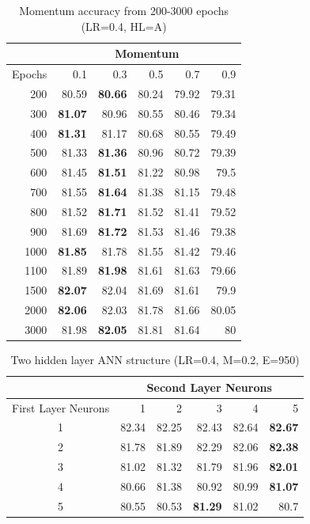 \documentclass[12pt]{article}
\begin{document}
      \begin{table}[H]
        \centering
        \caption{Momentum accuracy from 200-3000 epochs (LR=0.4, HL=A)}
          \begin{tabular}{r|rrrrr}
          \toprule
                & \multicolumn{5}{c}{Momentum} \\
          \midrule
          \multicolumn{1}{l|}{Epochs} & 0.1   & 0.3   & 0.5   & 0.7   & 0.9 \\
          \midrule
          200   & 80.59 & \textbf{80.66} & 80.24 & 79.92 & 79.31 \\
          300   & \textbf{81.07} & 80.96 & 80.55 & 80.46 & 79.34 \\
          400   & \textbf{81.31} & 81.17 & 80.68 & 80.55 & 79.49 \\
          500   & 81.33 & \textbf{81.36} & 80.96 & 80.72 & 79.39 \\
          600   & 81.45 & \textbf{81.51} & 81.22 & 80.98 & 79.5 \\
          700   & 81.55 & \textbf{81.64} & 81.38 & 81.15 & 79.48 \\
          800   & 81.52 & \textbf{81.71} & 81.52 & 81.41 & 79.52 \\
          900   & 81.69 & \textbf{81.72} & 81.53 & 81.46 & 79.38 \\
          1000  & \textbf{81.85} & 81.78 & 81.55 & 81.42 & 79.46 \\
          1100  & 81.89 & \textbf{81.98} & 81.61 & 81.63 & 79.66 \\
          1500  & \textbf{82.07} & 82.04 & 81.69 & 81.61 & 79.9 \\
          2000  & \textbf{82.06} & 82.03 & 81.78 & 81.66 & 80.05 \\
          3000  & 81.98 & \textbf{82.05} & 81.81 & 81.64 & 80 \\
          \bottomrule
          \end{tabular}%
        \label{tab:addlabel}%
      \end{table}%

      \begin{table}[H]
        \centering
        \caption{Two hidden layer ANN structure (LR=0.4, M=0.2, E=950)}
          \begin{tabular}{c|rrrrr}
            \toprule
              & \multicolumn{5}{c}{Second Layer Neurons} \\
            \midrule
              \multicolumn{1}{c|}{First Layer Neurons} & 1     & 2     & 3     & 4     & 5 \\
            \midrule
              1 & 82.34 & 82.25 & 82.43 & 82.64 & \textbf{82.67} \\
              2 & 81.78 & 81.89 & 82.29 & 82.06 & \textbf{82.38} \\
              3 & 81.02 & 81.32 & 81.79 & 81.96 & \textbf{82.01} \\
              4 & 80.66 & 81.38 & 80.92 & 80.99 & \textbf{81.07} \\
              5 & 80.55 & 80.53 & \textbf{81.29} & 81.02 & 80.7 \\
            \bottomrule
          \end{tabular}%
        \label{tab:addlabel}%
      \end{table}%
\end{document}
